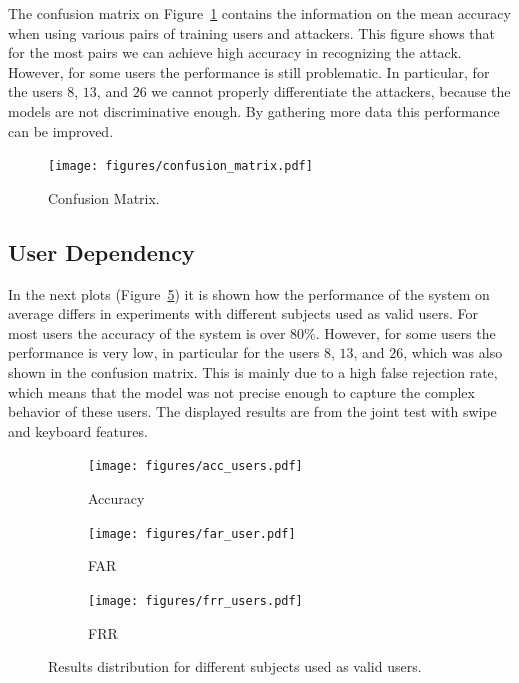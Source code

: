 \documentclass{llncs}
\begin{document}
The confusion matrix on Figure~\ref{fig:confmat} contains the information on the mean accuracy when using various pairs of training users and attackers. This figure shows that for the most pairs we can achieve high accuracy in recognizing the attack. However, for some users the performance is still problematic. In particular, for the users $8$, $13$, and $26$ we cannot properly differentiate the attackers, because the models are not discriminative enough. By gathering more data this performance can be improved.

\begin{figure}

  \centering
    \texttt{[image: figures/confusion\_matrix.pdf]}
  \caption{Confusion Matrix.}    
  \label{fig:confmat}
    
\end{figure}

\subsection{User Dependency}

In the next plots (Figure~\ref{fig:users}) it is shown how the performance of the system on average differs in experiments with different subjects used as valid users. For most users the accuracy of the system is over 80\%. However, for some users the performance is very low, in particular for the users $8$, $13$, and $26$, which was also shown in the confusion matrix. This is mainly due to a high false rejection rate, which means that the model was not precise enough to capture the complex behavior of these users. The displayed results are from the joint test with swipe and keyboard features.

\begin{figure}[!t]
    \centering
    \begin{subfigure}{0.32\textwidth}
        \texttt{[image: figures/acc\_users.pdf]}
        \caption{Accuracy}
        \label{fig:accuracy}
    \end{subfigure}
    \hfill
    \begin{subfigure}{0.32\textwidth}
        \texttt{[image: figures/far\_user.pdf]}
        \caption{FAR}
        \label{fig:far}
    \end{subfigure}
    \hfill
    \begin{subfigure}{0.32\textwidth}
        \texttt{[image: figures/frr\_users.pdf]}
        \caption{FRR}
        \label{fig:frr}
    \end{subfigure}
    \caption{Results distribution for different subjects used as valid users.}\label{fig:users}
\end{figure}
\end{document}
